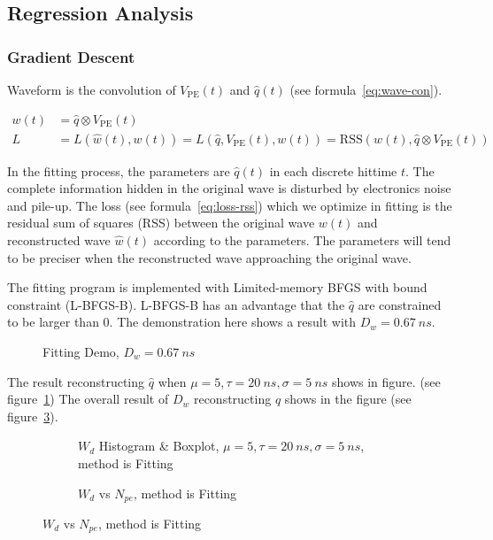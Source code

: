 \subsection{Regression Analysis}
\subsubsection{Gradient Descent}

Waveform is the convolution of $V_\mathrm{PE}(t)$ and $\hat{q}(t)$ (see formula~\eqref{eq:wave-con}). 

\begin{align}
    w(t) &= \hat{q} \otimes V_\mathrm{PE}(t) \label{eq:wave-con} \\
    L &= L(\hat{w}(t), w(t)) = L(\hat{q}, V_\mathrm{PE}(t), w(t)) = \mathrm{RSS}(w(t), \hat{q} \otimes V_\mathrm{PE}(t)) \label{eq:loss-rss}
\end{align}

In the fitting process, the parameters are $\hat{q}(t)$ in each discrete hittime $t$. The complete information hidden in the original wave is disturbed by electronics noise and pile-up. The loss (see formula~\ref{eq:loss-rss}) which we optimize in fitting is the residual sum of squares (RSS) between the original wave $w(t)$ and reconstructed wave $\hat{w}(t)$ according to the parameters. The parameters will tend to be preciser when the reconstructed wave approaching the original wave. 

The fitting program is implemented with Limited-memory BFGS with bound constraint \cite{byrd_limited_1995} (L-BFGS-B). L-BFGS-B has an advantage that the $\hat{q}$ are constrained to be larger than 0. The demonstration here shows a result with $D_w = \SI{0.67}{ns}$.

\begin{figure}[H]
    \centering
    \scalebox{0.4}{}
    \caption{Fitting Demo, $D_w = \SI{0.67}{ns}$}
\end{figure}

The result reconstructing $\hat{q}$ when $\mu=5, \tau=\SI{20}{ns}, \sigma=\SI{5}{ns}$ shows in figure. (see figure~\ref{fig:fitting-hist}) The overall result of $D_w$ reconstructing $\hat{q}$ shows in the figure (see figure~\ref{fig:fitting-npe}). 

\begin{figure}[H]
\begin{minipage}[t]{.5\textwidth}
\begin{figure}[H]
    \centering
    \resizebox{\textwidth}{!}{}
    \caption{\label{fig:fitting-hist} $W_{d}$ Histogram \& Boxplot, $\mu=5, \tau=\SI{20}{ns}, \sigma=\SI{5}{ns}$, method is Fitting}
\end{figure}
\end{minipage}
\begin{minipage}[t]{.5\textwidth}
\begin{figure}[H]
    \centering
    \resizebox{\textwidth}{!}{}
    \caption{\label{fig:fitting-npe} $W_{d}$ vs $N_{pe}$, method is Fitting}
\end{figure}
\end{minipage}
\end{figure}

